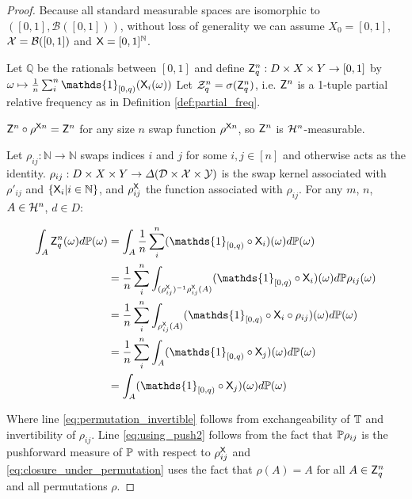 \begin{proof}
Because all standard measurable spaces are isomorphic to $([0,1],\mathcal{B}([0,1]))$, without loss of generality we can assume $X_0=[0,1]$, $\mathcal{X}=\mathcal{B}([0,1])$ and $\mathsf{X}=[0,1]^{\mathbb{N}}$.

Let $\mathbb{Q}$ be the rationals between $[0,1]$ and define $\mathsf{Z}_q^n:D\times X\times Y \to [0,1]$ by $\omega \mapsto \frac{1}{n}\sum_{i}^n \mathds{1}_{[0,q)}(\RV{X}_i(\omega))$ Let $\mathcal{Z}^n_q=\sigma(\mathsf{Z}_q^n)$, i.e. $\mathsf{Z}^n$ is a 1-tuple partial relative frequency as in Definition \ref{def:partial_freq}.

$\mathsf{Z}^n\circ\rho^{\mathsf{X}n}=\mathsf{Z}^n$ for any size $n$ swap function $\rho^{\mathsf{X}n}$, so $\mathsf{Z}^n$ is $\mathcal{H}^n$-measurable.

Let $\rho_{ij}:\mathbb{N}\to\mathbb{N}$ swaps indices $i$ and $j$ for some $i,j\in[n]$ and otherwise acts as the identity. $\rho_{ij}:D\times X\times Y\to \Delta(\mathcal{D}\times \mathcal{X}\times \mathcal{Y})$ is the swap kernel associated with $\rho'_{ij}$ and $\{\mathsf{X}_i|i\in \mathbb{N}\}$, and $\rho^{\mathsf{X}}_{ij}$ the function associated with $\rho_{ij}$. For any $m$, $n$, $A\in \mathcal{H}^n$, $d\in D$: 

\begin{align}
    \int_{A} \RV{Z}_q^{n} (\omega) d\prob{P}(\omega) &= \int_{A} \frac{1}{n}\sum_{i}^{n} (\mathds{1}_{[0,q)}\circ \RV{X}_i)(\omega)d\prob{P}(\omega)\\
    &= \frac{1}{n}\sum_{i}^{n} \int_{(\rho^{\RV{X}}_{ij})^{-1}\rho^{\RV{X}}_{ij}(A)} (\mathds{1}_{[0,q)}\circ \RV{X}_i)(\omega)d\prob{P}\rho_{ij}(\omega)\label{eq:permutation_invertible}\\
    &= \frac{1}{n}\sum_{i}^{n} \int_{\rho^{\RV{X}}_{ij}(A)} (\mathds{1}_{[0,q)}\circ \RV{X}_{i}\circ \rho_{ij}) (\omega)d\prob{P}(\omega)\label{eq:using_push2}\\
    &= \frac{1}{n}\sum_{i}^{n} \int_{A} (\mathds{1}_{[0,q)}\circ \RV{X}_{j})(\omega)d\prob{P}(\omega)\label{eq:closure_under_permutation}\\
    &= \int_{A} (\mathds{1}_{[0,q)} \circ \RV{X}_j)(\omega)d\prob{P}(\omega) \label{eq:cond_expectation_first}
\end{align}

Where line \ref{eq:permutation_invertible} follows from exchangeability of $\mathbb{T}$ and invertibility of $\rho_{ij}$. Line \ref{eq:using_push2} follows from the fact that $\mathbb{P}\rho_{ij}$ is the pushforward measure of $\mathbb{P}$ with respect to $\rho^{\mathsf{X}}_{ij}$ and \ref{eq:closure_under_permutation} uses the fact that $\rho(A) = A$ for all $A\in \mathsf{Z}^n_q$ and all permutations $\rho$.


\end{proof}
